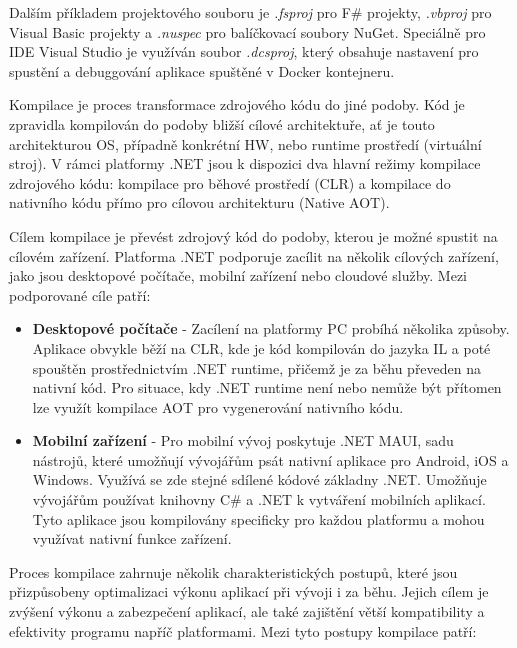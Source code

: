 Dalším příkladem projektového souboru je \emph{.fsproj} pro F\# projekty, \emph{.vbproj} pro Visual Basic projekty a \emph{.nuspec} pro balíčkovací soubory NuGet. Speciálně pro IDE Visual Studio je využíván soubor \emph{.dcsproj}, který obsahuje nastavení pro spustění a debuggování aplikace spuštěné v Docker kontejneru. 


Kompilace je proces transformace zdrojového kódu do jiné podoby. Kód je zpravidla kompilován do podoby bližší cílové architektuře, ať je touto architekturou OS, případně konkrétní HW, nebo runtime prostředí (virtuální stroj). V rámci platformy .NET jsou k dispozici dva hlavní režimy kompilace zdrojového kódu: kompilace pro běhové prostředí (CLR) a kompilace do nativního kódu přímo pro cílovou architekturu (Native AOT). \cite{Price2023}


Cílem kompilace je převést zdrojový kód do podoby, kterou je možné spustit na cílovém zařízení. Platforma .NET podporuje zacílit na několik cílových zařízení, jako jsou desktopové počítače, mobilní zařízení nebo cloudové služby. Mezi podporované cíle patří:

\begin{itemize}
    \item \textbf{Desktopové počítače} - Zacílení na platformy PC probíhá několika způsoby. Aplikace obvykle běží na CLR, kde je kód kompilován do jazyka IL a poté spouštěn prostřednictvím .NET runtime, přičemž je za běhu převeden na nativní kód. Pro situace, kdy .NET runtime není nebo nemůže být přítomen lze využít kompilace AOT pro vygenerování nativního kódu.
    \item \textbf{Mobilní zařízení} - Pro mobilní vývoj poskytuje .NET MAUI, sadu nástrojů, které umožňují vývojářům psát nativní aplikace pro Android, iOS a Windows. Využívá se zde stejné sdílené kódové základny .NET. Umožňuje vývojářům používat knihovny C\# a .NET k vytváření mobilních aplikací. Tyto aplikace jsou kompilovány specificky pro každou platformu a mohou využívat nativní funkce zařízení.
\end{itemize}


Proces kompilace zahrnuje několik charakteristických postupů, které jsou přizpůsobeny optimalizaci výkonu aplikací při vývoji i za běhu. Jejich cílem je zvýšení výkonu a zabezpečení aplikací, ale také zajištění větší kompatibility a efektivity programu napříč platformami. \cite{netdocs} Mezi tyto postupy kompilace patří:

